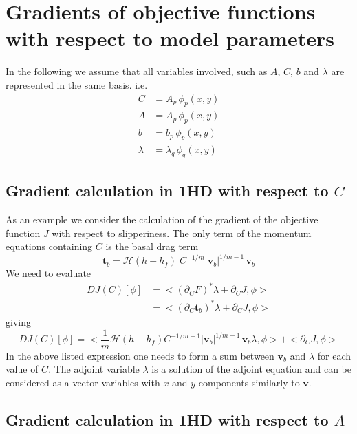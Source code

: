 \documentclass[10pt,a4paper]{book}
\newcommand{\He}{\mathcal{H}}
\newcommand{\p}{\partial}
\begin{document}
\section{Gradients of objective functions with respect to model parameters}



In the following we assume that all variables involved, such as $A$, $C$, $b$ and $\lambda$ are represented in the same basis. i.e.
\begin{align*}
          C & = A_p \, \phi_p(x,y) \\ 
          A & = A_p \, \phi_p(x,y) \\ 
          b & = b_p \, \phi_p(x,y) \\ 
    \lambda & =\lambda_q \, \phi_q(x,y)
\end{align*}



\subsection{Gradient calculation in 1HD with respect to $C$}

As an example we consider the calculation of the gradient of the
objective function $J$ with respect to slipperiness. The only term of
the momentum equations containing $C$ is the basal drag term
\[
\bm{t}_b   = \He(h-h_f) \; C^{-1/m} | \bm{v}_b|^{1/m-1} \, \bm{v}_b 
\]
We need to evaluate 
\begin{align*}
 D J(C)[\phi] &= < (\p_C F)^\ast \lambda  + \p_C J ,  \phi >  \\
              &= < (\p_C \bm{t}_b)^\ast \lambda  + \p_C J ,  \phi > 
\end{align*}
giving
\[
D J(C)[\phi]=< \frac{1}{m} \He(h-h_f) C^{-1/m-1} | \bm{v}_b|^{1/m-1} \, \bm{v}_b   \lambda  , \phi > +  < \p_C J ,  \phi > 
\]
In the above listed expression one needs to form a sum between
$\bm{v}_b$ and $\lambda$ for each value of $C$. The adjoint variable
$\lambda$ is a solution of the adjoint equation and can be considered
as a vector variables with $x$ and $y$ components similarly to
$\bm{v}$.

\subsection{Gradient calculation in 1HD with respect to $A$}
\end{document}
